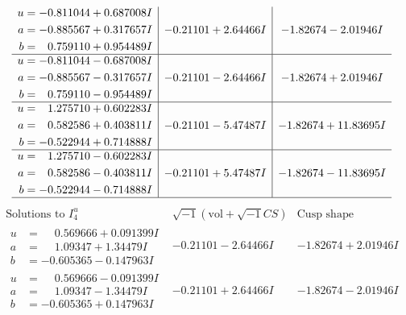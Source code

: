 \documentclass[1p]{elsarticle_modified}
\theoremstyle{definition}
\newcommand{\I}{\sqrt{-1}}
\begin{document}
$$\begin{array}{c|c|c}
\begin{aligned}
u &= -0.811044 + 0.687008 I \\
a &= -0.885567 + 0.317657 I \\
b &= \phantom{-}0.759110 + 0.954489 I\end{aligned}
 & -0.21101 + 2.64466 I & -1.82674 - 2.01946 I \\ \hline\begin{aligned}
u &= -0.811044 - 0.687008 I \\
a &= -0.885567 - 0.317657 I \\
b &= \phantom{-}0.759110 - 0.954489 I\end{aligned}
 & -0.21101 - 2.64466 I & -1.82674 + 2.01946 I \\ \hline\begin{aligned}
u &= \phantom{-}1.275710 + 0.602283 I \\
a &= \phantom{-}0.582586 + 0.403811 I \\
b &= -0.522944 + 0.714888 I\end{aligned}
 & -0.21101 - 5.47487 I & -1.82674 + 11.83695 I \\ \hline\begin{aligned}
u &= \phantom{-}1.275710 - 0.602283 I \\
a &= \phantom{-}0.582586 - 0.403811 I \\
b &= -0.522944 - 0.714888 I\end{aligned}
 & -0.21101 + 5.47487 I & -1.82674 - 11.83695 I\\
 \hline 
 \end{array}$$\newpage$$\begin{array}{c|c|c}  
\text{Solutions to }I^u_{4}& \I (\text{vol} + \sqrt{-1}CS) & \text{Cusp shape}\\
 \hline 
\begin{aligned}
u &= \phantom{-}0.569666 + 0.091399 I \\
a &= \phantom{-}1.09347 + 1.34479 I \\
b &= -0.605365 - 0.147963 I\end{aligned}
 & -0.21101 - 2.64466 I & -1.82674 + 2.01946 I \\ \hline\begin{aligned}
u &= \phantom{-}0.569666 - 0.091399 I \\
a &= \phantom{-}1.09347 - 1.34479 I \\
b &= -0.605365 + 0.147963 I\end{aligned}
 & -0.21101 + 2.64466 I & -1.82674 - 2.01946 I \\ \hline\begin{aligned}

\end{aligned}
\end{array}$$
\end{document}
